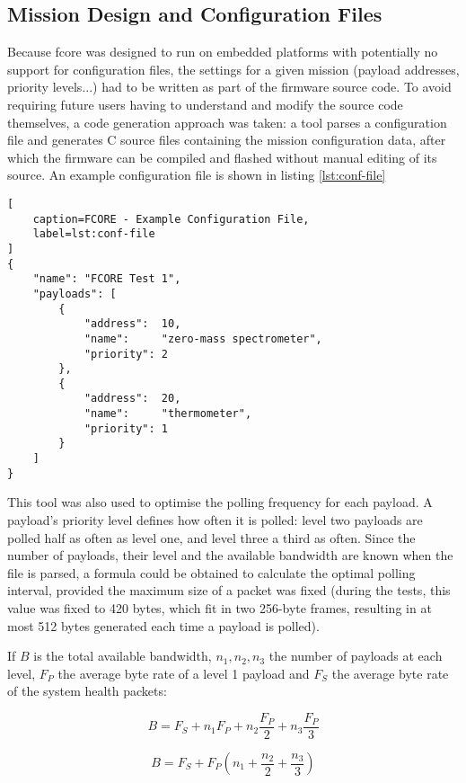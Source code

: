 \subsection{Mission Design and Configuration Files}
\label{ssec:conf-file}

Because \acrshort{fcore} was designed to run on embedded platforms with 
potentially no support for configuration files, the settings for a given mission
(payload addresses, priority levels...) had to be written as part of the
firmware source code. To avoid requiring future users having to understand and
modify the source code themselves, a code generation approach was taken: a
tool parses a configuration file and generates C source files containing the
mission configuration data, after which the firmware can be compiled and flashed
without manual editing of its source. An example configuration file is shown
in listing \ref{lst:conf-file}

\begin{lstlisting}[
    caption=FCORE - Example Configuration File,
    label=lst:conf-file
]
{
    "name": "FCORE Test 1",
    "payloads": [
        {
            "address":  10,
            "name":     "zero-mass spectrometer",
            "priority": 2
        },
        {
            "address":  20,
            "name":     "thermometer",
            "priority": 1
        }
    ]
}
\end{lstlisting}

This tool was also used to optimise the polling frequency for each payload.
A payload's priority level defines how often it is polled: level two payloads
are polled half as often as level one, and level three a third as often. Since
the number of payloads, their level and the available bandwidth are known when
the file is parsed, a formula could be obtained to calculate the optimal
polling interval, provided the maximum size of a packet was fixed (during the
tests, this value was fixed to 420 bytes, which fit in two 256-byte frames,
resulting in at most 512 bytes generated each time a payload is polled).

If $B$ is the total available bandwidth, $n_1, n_2, n_3$ the number of payloads
at each level, $F_P$ the average byte rate of a level 1 payload and $F_S$ the
average byte rate of the system health packets:

\[B = F_S + n_{1}F_{P} + n_{2}\frac{F_{P}}{2} + n_{3}\frac{F_{P}}{3} \]

\[B = F_S + F_{P}(n_{1} + \frac{n_2}{2} + \frac{n_3}{3}) \]


